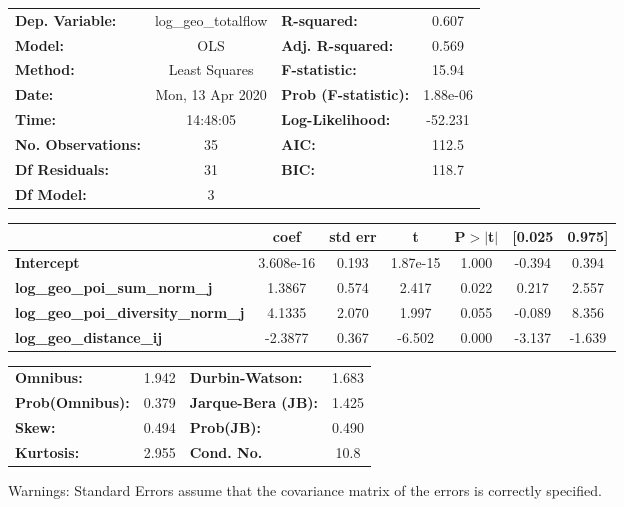 \begin{center}
\begin{tabular}{lclc}
\toprule
\textbf{Dep. Variable:}                    & log\_geo\_totalflow & \textbf{  R-squared:         } &     0.607   \\
\textbf{Model:}                            &         OLS         & \textbf{  Adj. R-squared:    } &     0.569   \\
\textbf{Method:}                           &    Least Squares    & \textbf{  F-statistic:       } &     15.94   \\
\textbf{Date:}                             &   Mon, 13 Apr 2020  & \textbf{  Prob (F-statistic):} &  1.88e-06   \\
\textbf{Time:}                             &       14:48:05      & \textbf{  Log-Likelihood:    } &   -52.231   \\
\textbf{No. Observations:}                 &            35       & \textbf{  AIC:               } &     112.5   \\
\textbf{Df Residuals:}                     &            31       & \textbf{  BIC:               } &     118.7   \\
\textbf{Df Model:}                         &             3       & \textbf{                     } &             \\
\bottomrule
\end{tabular}
\begin{tabular}{lcccccc}
                                           & \textbf{coef} & \textbf{std err} & \textbf{t} & \textbf{P$> |$t$|$} & \textbf{[0.025} & \textbf{0.975]}  \\
\midrule
\textbf{Intercept}                         &    3.608e-16  &        0.193     &  1.87e-15  &         1.000        &       -0.394    &        0.394     \\
\textbf{log\_geo\_poi\_sum\_norm\_j}       &       1.3867  &        0.574     &     2.417  &         0.022        &        0.217    &        2.557     \\
\textbf{log\_geo\_poi\_diversity\_norm\_j} &       4.1335  &        2.070     &     1.997  &         0.055        &       -0.089    &        8.356     \\
\textbf{log\_geo\_distance\_ij}            &      -2.3877  &        0.367     &    -6.502  &         0.000        &       -3.137    &       -1.639     \\
\bottomrule
\end{tabular}
\begin{tabular}{lclc}
\textbf{Omnibus:}       &  1.942 & \textbf{  Durbin-Watson:     } &    1.683  \\
\textbf{Prob(Omnibus):} &  0.379 & \textbf{  Jarque-Bera (JB):  } &    1.425  \\
\textbf{Skew:}          &  0.494 & \textbf{  Prob(JB):          } &    0.490  \\
\textbf{Kurtosis:}      &  2.955 & \textbf{  Cond. No.          } &     10.8  \\
\bottomrule
\end{tabular}
\end{center}

Warnings: \newline
 [1] Standard Errors assume that the covariance matrix of the errors is correctly specified.